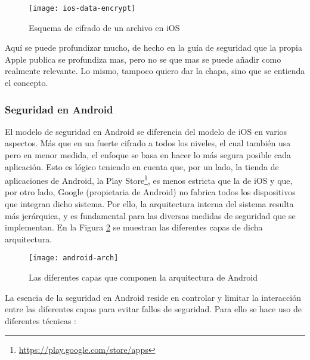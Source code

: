 \begin{figure}[H]
	\centering
	\texttt{[image: ios-data-encrypt]}
	\caption{Esquema de cifrado de un archivo en iOS}
	\label{fig:ios-data-encrypt}
\end{figure}

{\color{red} Aquí se puede profundizar mucho, de hecho en la guía de seguridad que la propia Apple publica \cite{ios-sec-guide} se profundiza mas, pero no se que mas se puede añadir como realmente relevante. Lo mismo, tampoco quiero dar la chapa, sino que se entienda el concepto.}

\subsubsection{Seguridad en Android}

El modelo de seguridad en Android se diferencia del modelo de iOS en varios aspectos. Más que en un fuerte cifrado a todos los niveles, el cual también usa pero en menor medida, el enfoque se basa en hacer lo más segura posible cada aplicación. Esto es lógico teniendo en cuenta que, por un lado, la tienda de aplicaciones de Android, la Play Store\footnote{\url{https://play.google.com/store/apps}}, es menos estricta que la de iOS y que, por otro lado, Google (propietaria de Android) no fabrica todos los dispositivos que integran dicho sistema. Por ello, la arquitectura interna del sistema resulta más jerárquica, y es fundamental para las diversas medidas de seguridad que se implementan. En la Figura \ref{fig:android-arch} se muestran las diferentes capas de dicha arquitectura. 

\begin{figure}[H]
	\centering
	\texttt{[image: android-arch]}
	\caption{Las diferentes capas que componen la arquitectura de Android}
	\label{fig:android-arch}
\end{figure}

La esencia de la seguridad en Android reside en controlar y limitar la interacción entre las diferentes capas para evitar fallos de seguridad. Para ello se hace uso de diferentes técnicas \cite{android-sec-guide} \cite{jspdcp-2014}:

